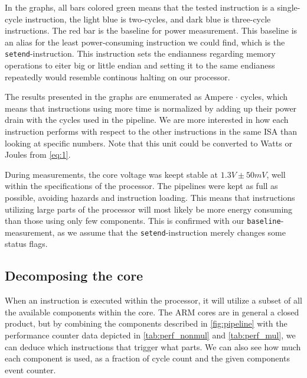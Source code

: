 In the graphs, all bars colored green means that the tested instruction is a
single-cycle instruction, the light blue is two-cycles, and dark blue is
three-cycle instructions. The red bar is the baseline for power measurement.
This baseline is an alias for the least power-consuming instruction we could
find, which is the \texttt{setend}-instruction. This instruction sets the
endianness regarding memory operations to eiter big or little
endian \cite{armcompilerref} and setting it to the same endianess repeatedly
would resemble continous halting on our processor.

The results presented in the graphs are enumerated as Ampere $\cdot$ cycles,
which means that instructions using more time is normalized by adding up their
power drain with the cycles used in the pipeline. We are more interested in how
each instruction performs with respect to the other instructions in the same ISA
than looking at specific numbers. Note that this unit could be converted to
Watts or Joules from \autoref{eq:1}.

During measurements, the core voltage was keept stable at $1.3V\pm50mV$, well
within the specifications of the processor. The pipelines were kept as full as
possible, avoiding hazards and instruction loading. This means that instructions
utilizing large parts of the processor will most likely be more energy consuming
than those using only few components. This is confirmed with our
\texttt{baseline}-measurement, as we assume that the \texttt{setend}-instruction
merely changes some status flags.

\subsection{Decomposing the core}
When an instruction is executed within the processor, it will utilize a subset
of all the available components within the core. The ARM cores are in general a
closed product, but by combining the components described in
\autoref{fig:pipeline} with the performance counter data depicted in
\autoref{tab:perf_nonmul} and \autoref{tab:perf_mul}, we can deduce which
instructions that trigger what parts. We can also see how much each component is
used, as a fraction of cycle count and the given components event counter.

